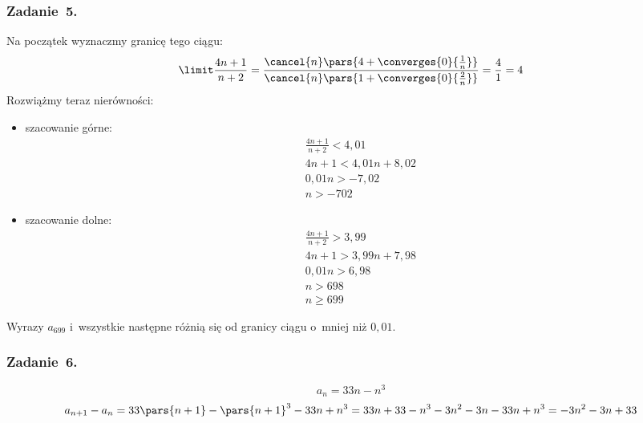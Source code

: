 \subsubsection*{Zadanie~5.}
Na początek wyznaczmy granicę tego ciągu:
\begin{equation*}
    \limit \frac{4n + 1}{n + 2}
        = \frac{\cancel{n}\pars{4 + \converges{0}{\frac{1}{n}}}}{\cancel{n}\pars{1 + \converges{0}{\frac{2}{n}}}}
        = \frac{4}{1}
        = 4
\end{equation*}
Rozwiążmy teraz nierówności:
\begin{itemize}
    \item szacowanie górne:
        \begin{gather*}
            \frac{4n + 1}{n + 2} < 4{,}01\\
            4n + 1 < 4{,}01n + 8{,}02\\
            0{,}01n > -7{,}02\\
            n > -702
        \end{gather*}
    \item szacowanie dolne:
        \begin{gather*}
            \frac{4n + 1}{n + 2} > 3{,}99\\
            4n + 1 > 3{,}99n + 7{,}98\\
            0,01n > 6{,}98\\
            n > 698\\
            n \geq 699
        \end{gather*}
\end{itemize}
Wyrazy \(a_{699}\) i~wszystkie następne różnią się od granicy ciągu o~mniej niż \(0{,}01\).
\subsubsection*{Zadanie~6.}
\begin{equation*}
    a_n = 33n - n^3
\end{equation*}
\begin{equation*}
    a_{n + 1} - a_n
        = 33\pars{n + 1} - \pars{n + 1}^3 - 33n + n^3
        = 33n + 33 - n^3 - 3n^2 - 3n - 33n + n^3
        = -3n^2 - 3n + 33
\end{equation*}
